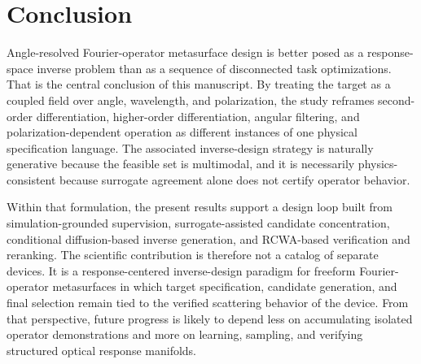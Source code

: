 \section{Conclusion}

Angle-resolved Fourier-operator metasurface design is better posed as a response-space inverse problem than as a sequence of disconnected task optimizations. That is the central conclusion of this manuscript. By treating the target as a coupled field over angle, wavelength, and polarization, the study reframes second-order differentiation, higher-order differentiation, angular filtering, and polarization-dependent operation as different instances of one physical specification language. The associated inverse-design strategy is naturally generative because the feasible set is multimodal, and it is necessarily physics-consistent because surrogate agreement alone does not certify operator behavior.

Within that formulation, the present results support a design loop built from simulation-grounded supervision, surrogate-assisted candidate concentration, conditional diffusion-based inverse generation, and RCWA-based verification and reranking. The scientific contribution is therefore not a catalog of separate devices. It is a response-centered inverse-design paradigm for freeform Fourier-operator metasurfaces in which target specification, candidate generation, and final selection remain tied to the verified scattering behavior of the device. From that perspective, future progress is likely to depend less on accumulating isolated operator demonstrations and more on learning, sampling, and verifying structured optical response manifolds.
